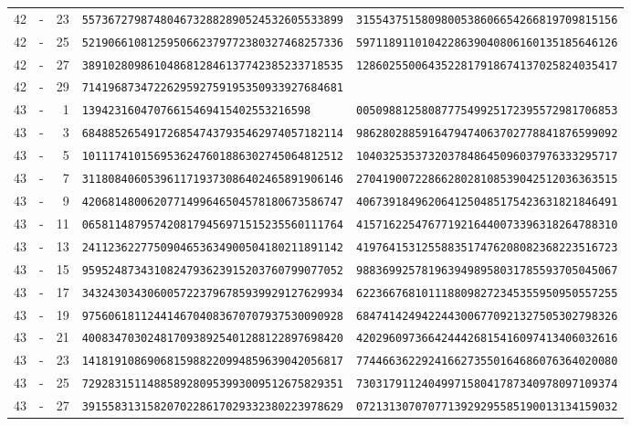 \begin{longtable}{@{}rcrll@{}}
42&-&23&\texttt{5573672798748046732882890524532605533899}&\texttt{3155437515809800538606654266819709815156}\\
42&-&25&\texttt{5219066108125950662379772380327468257336}&\texttt{5971189110104228639040806160135185646126}\\
42&-&27&\texttt{3891028098610486812846137742385233718535}&\texttt{1286025500643522817918674137025824035417}\\
42&-&29&\texttt{7141968734722629592759195350933927684681}&\texttt{}\\
43&-&1&\texttt{13942316047076615469415402553216598}&\texttt{0050988125808777549925172395572981706853}\\
43&-&3&\texttt{6848852654917268547437935462974057182114}&\texttt{9862802885916479474063702778841876599092}\\
43&-&5&\texttt{1011174101569536247601886302745064812512}&\texttt{1040325353732037848645096037976333295717}\\
43&-&7&\texttt{3118084060539611719373086402465891906146}&\texttt{2704190072286628028108539042512036363515}\\
43&-&9&\texttt{4206814800620771499646504578180673586747}&\texttt{4067391849620641250485175423631821846491}\\
43&-&11&\texttt{0658114879574208179456971515235560111764}&\texttt{4157162254767719216440073396318264788310}\\
43&-&13&\texttt{2411236227750904653634900504180211891142}&\texttt{4197641531255883517476208082368223516723}\\
43&-&15&\texttt{9595248734310824793623915203760799077052}&\texttt{9883699257819639498958031785593705045067}\\
43&-&17&\texttt{3432430343060057223796785939929127629934}&\texttt{6223667681011188098272345355950950557255}\\
43&-&19&\texttt{9756061811244146704083670707937530090928}&\texttt{6847414249422443006770921327505302798326}\\
43&-&21&\texttt{4008347030248170938925401288122897698420}&\texttt{4202960973664244426815416097413406032616}\\
43&-&23&\texttt{1418191086906815988220994859639042056817}&\texttt{7744663622924166273550164686076364020080}\\
43&-&25&\texttt{7292831511488589280953993009512675829351}&\texttt{7303179112404997158041787340978097109374}\\
43&-&27&\texttt{3915583131582070228617029332380223978629}&\texttt{0721313070707713929295585190013134159032}\\

\end{longtable}
